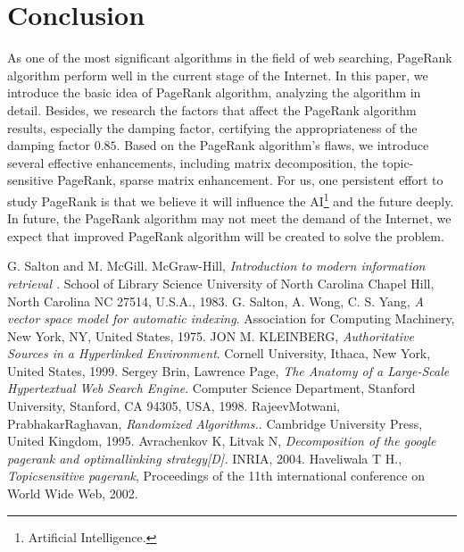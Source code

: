 \documentclass[lettersize,journal,12pt,conference]{IEEEtran}
\begin{document}
\section{Conclusion}

As one of the most significant algorithms in the field of web searching, PageRank algorithm perform well in the current stage of the Internet. In this paper, we introduce the basic idea of PageRank algorithm, analyzing the algorithm in detail. Besides, we research the factors that affect the PageRank algorithm results, especially the damping factor, certifying the appropriateness of the damping factor $0.85$. Based on the PageRank algorithm's flaws, we introduce several effective enhancements, including matrix decomposition, the topic-sensitive PageRank, sparse matrix enhancement. For us, one persistent effort to study PageRank is that we believe it will influence the AI\footnote[1]{Artificial Intelligence.} and the future deeply. In future, the PageRank algorithm may not meet the demand of the Internet, we expect that improved PageRank algorithm will be created to solve the problem. 

\begin{thebibliography}{1}

	G. Salton and M. McGill. McGraw-Hill, {\it{Introduction to modern information retrieval }}. School of Library Science University of North Carolina Chapel Hill, North Carolina NC 27514, U.S.A., 1983. 
    G. Salton, A. Wong, C. S. Yang, {\it{A vector space model for automatic indexing}}. Association for Computing Machinery, New York, NY, United States, 1975.
	JON M. KLEINBERG, {\it{Authoritative Sources in a Hyperlinked Environment}}. Cornell University, Ithaca, New York, United States, 1999.
	Sergey Brin, Lawrence Page, {\it{The Anatomy of a Large-Scale Hypertextual Web
	Search Engine}}. Computer Science Department, Stanford University, Stanford, CA 94305, USA, 1998.
	RajeevMotwani, PrabhakarRaghavan, {\it{Randomized Algorithms.}}. Cambridge University Press, United Kingdom, 1995.
	Avrachenkov K, Litvak N, {\it{Decomposition of the google pagerank and optimallinking strategy[D].}} INRIA, 2004.
	Haveliwala T H., {\it{Topicsensitive pagerank}}, Proceedings of the 11th international conference on World Wide Web, 2002.

\end{thebibliography}
\end{document}
